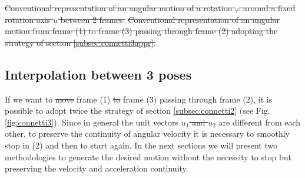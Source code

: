 \documentclass[preprint, 12pt]{elsarticle}
\def\vect#1{{\boldsymbol{#1}}}
\newcommand{\norm}[1]{\left\lVert#1\right\rVert}
\providecommand{\DIFadd}[1]{{\protect\color{blue}\uwave{#1}}} %
\providecommand{\DIFdel}[1]{{\protect\color{red}\sout{#1}}}                      %
\providecommand{\DIFaddbegin}{} %
\providecommand{\DIFaddend}{} %
\providecommand{\DIFdelbegin}{} %
\providecommand{\DIFdelend}{} %
\providecommand{\DIFdelFL}[1]{\DIFdel{#1}} %
\begin{document}


\DIFdelbegin %
{%
\DIFdelFL{Conventional representation of an angular motion of a rotation $\varphi$ around a fixed rotation axis $u$ between 2 frames.}}
{%
\DIFdelFL{Conventional representation of an angular motion from frame (1) to frame (3) passing through frame (2) adopting the strategy of section \ref{subsec:connetti3appr}.}}

\DIFdelend \subsection{Interpolation between 3 poses}
\DIFaddbegin \label{subsec:connetti3}
\DIFaddend If we want to \DIFdelbegin \DIFdel{move }\DIFdelend \DIFaddbegin \DIFadd{rotate }\DIFaddend frame (1) \DIFdelbegin \DIFdel{to }\DIFdelend \DIFaddbegin \DIFadd{into }\DIFaddend frame (3) passing through frame (2), it is possible to adopt twice the strategy of section \ref{subsec:connetti2} (see Fig. \ref{fig:connetti3}). Since in general the unit vectors \DIFdelbegin \DIFdel{$u_1$ and $u_2$ }\DIFdelend \DIFaddbegin \DIFadd{$\vect{u}_1$ and $\vect{u}_2$ }\DIFaddend are different from each other, to preserve the continuity of angular velocity it is necessary to smoothly stop in (2) and then to start again. In the next sections we will present two methodologies to generate the desired motion without the necessity to stop but preserving the velocity and acceleration continuity.
\end{document}
